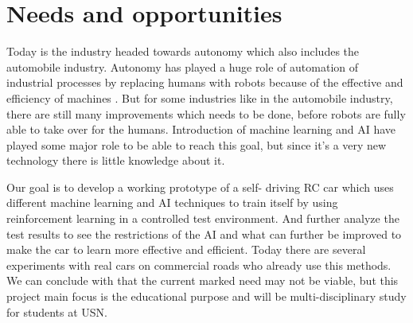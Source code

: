 \documentclass{article}
\begin{document}
\section{Needs and opportunities} 

Today is the industry headed towards autonomy which also includes the automobile industry. Autonomy has played a huge role of automation of industrial processes by replacing humans with robots because of the effective and efficiency of machines . But for some industries like in the automobile industry, there are still many improvements which needs to be done, before robots are fully able to take over for the humans. Introduction of machine learning and AI have played some major role to be able to reach this goal, but since it’s a very new technology there is little knowledge about it. 

Our goal is to develop a working prototype of a self- driving RC car which uses different machine learning and AI techniques to train itself by using reinforcement learning in a controlled test environment. And further analyze the test results to see the restrictions of the AI and what can further be improved to make the car to learn more effective and efficient. Today there are several experiments with real cars on commercial roads who already use this methods. 
We can conclude with that the current marked need may not be viable, but this project main focus is the educational purpose and will be multi-disciplinary study for students at USN.

  
\end{document}
